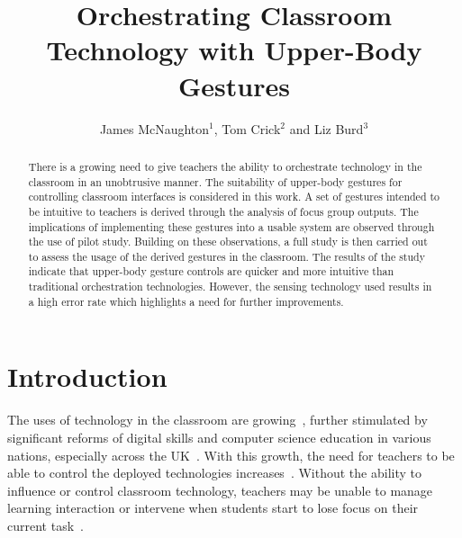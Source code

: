 \documentclass[link]{IWCOMP}
\begin{document}
\title{Orchestrating Classroom Technology with Upper-Body Gestures}

\author{James McNaughton$^{1}$, Tom Crick$^{2}$ and Liz Burd$^{3}$}



\begin{abstract}
There is a growing need to give teachers the ability to orchestrate technology in the classroom in an unobtrusive manner.
The suitability of upper-body gestures for controlling classroom interfaces is considered in this work.
A set of gestures intended to be intuitive to teachers is derived through the analysis of focus group outputs.
The implications of implementing these gestures into a usable system are observed through the use of pilot study.
Building on these observations, a full study is then carried out to assess the usage of the derived gestures in the classroom.
The results of the study indicate that upper-body gesture controls are quicker and more intuitive than traditional orchestration technologies.
However, the sensing technology used results in a high error rate which highlights a need for further improvements.
\end{abstract}




\maketitle

\section{Introduction}
\label{sec:intro}

The uses of technology in the classroom are
growing~\cite{Schrum2008,Lloyd2011,Robertson2012},
further stimulated by significant reforms of digital skills and computer science education in various nations, especially across the UK~\cite{brown-et-al:toce2014}.
With this growth, the need for teachers to be able to control the deployed technologies increases~\cite{Apple1990,Selwyn2010,Selwyn2011}.
Without the ability to influence or control classroom technology, teachers may be unable to manage learning interaction or intervene when students start to lose focus on their current task~\cite{Chen2005,Karabenick2011}.
\end{document}
